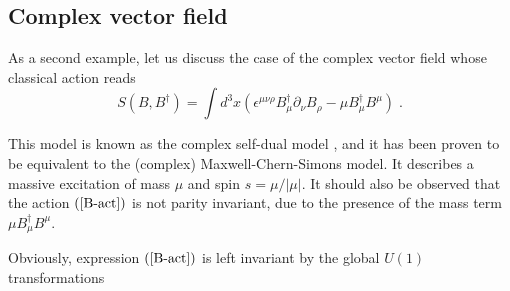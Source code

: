 \documentclass[a4paper,12pt]{article}
\begin{document}
\subsection{Complex vector field}
As a second example, let us discuss the case of the complex vector
field whose classical action reads
\begin{equation}
S(B,B^{\dagger })=\int d^3x\left( \epsilon ^{\mu \nu \rho }B_\mu^{\dagger }\partial _\nu B_\rho -\mu B_\mu ^{\dagger }B^\mu \right) \;.
\label{B-act}
\end{equation}

This model is known as the complex self-dual model \cite{self-dual},
and it has been proven to be equivalent to the (complex)
Maxwell-Chern-Simons model. It describes a massive excitation of mass
$\mu$ and spin $s=\mu /|\mu |$. It should also be observed that the
action $\left( {\rm {\ref {B-act}}}\right) $ is not parity invariant,
due to the presence of the mass term $\mu B_\mu ^{\dagger }B^\mu $.

\noindent Obviously, expression $\left( {\rm {\ref{B-act}}}\right) $ is left
invariant by the global $U(1)$ transformations
\end{document}
